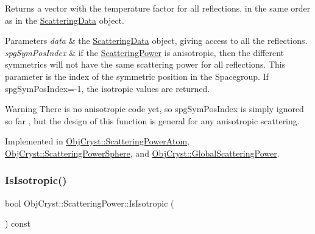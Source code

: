 \begin{DoxyReturn}{Returns}
a vector with the temperature factor for all reflections, in the same order as in the \mbox{\hyperlink{class_obj_cryst_1_1_scattering_data}{Scattering\+Data}} object. 
\end{DoxyReturn}

\begin{DoxyParams}{Parameters}
{\em data} & the \mbox{\hyperlink{class_obj_cryst_1_1_scattering_data}{Scattering\+Data}} object, giving access to all the reflections. \\
\hline
{\em spg\+Sym\+Pos\+Index} & if the \mbox{\hyperlink{class_obj_cryst_1_1_scattering_power}{Scattering\+Power}} is anisotropic, then the different symmetrics will not have the same scattering power for all reflections. This parameter is the index of the symmetric position in the Spacegroup. If spg\+Sym\+Pos\+Index=-\/1, the isotropic values are returned. \\
\hline
\end{DoxyParams}
\begin{DoxyWarning}{Warning}
There is no anisotropic code yet, so spg\+Sym\+Pos\+Index is simply ignored so far , but the design of this function is general for any anisotropic scattering. 
\end{DoxyWarning}


Implemented in \mbox{\hyperlink{class_obj_cryst_1_1_scattering_power_atom_adc30331f57e8d79f362b4f2bccb9d4dd}{Obj\+Cryst\+::\+Scattering\+Power\+Atom}}, \mbox{\hyperlink{class_obj_cryst_1_1_scattering_power_sphere_a279d60a417e6378ad001be222385cced}{Obj\+Cryst\+::\+Scattering\+Power\+Sphere}}, and \mbox{\hyperlink{class_obj_cryst_1_1_global_scattering_power_a52a96c9df409e14e5209fa0d1c16781c}{Obj\+Cryst\+::\+Global\+Scattering\+Power}}.

\mbox{\label{class_obj_cryst_1_1_scattering_power_a377a16510c3fac75c84bb8b100cc3a2d}} 
\subsubsection{\texorpdfstring{IsIsotropic()}{IsIsotropic()}}
{\footnotesize\ttfamily bool Obj\+Cryst\+::\+Scattering\+Power\+::\+Is\+Isotropic (\begin{DoxyParamCaption}{ }\end{DoxyParamCaption}) const}



